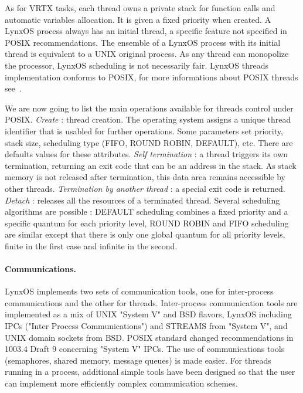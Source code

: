 \documentclass[10pt]{report}
\begin{document}
As for VRTX tasks, each thread owns a private stack for function calls and automatic variables allocation. It is given a fixed 
priority when created. A LynxOS process always has an initial thread, a specific feature not specified in POSIX recommendations.
The ensemble of a LynxOS process with its initial thread is equivalent to a UNIX original process. As any thread can
monopolize the processor, LynxOS scheduling is not necessarily fair. LynxOS threads implementation conforms to POSIX, for more 
informations about POSIX threads see~\cite{JMR:94}.

We are now going to list the main operations available for threads control under POSIX. {\em Create} : thread creation. 
The operating system assigns a unique thread identifier that is usabled for further operations. Some parameters set priority, stack size,
scheduling type (FIFO, ROUND ROBIN, DEFAULT), etc. There are defaults values for these attributes. {\em Self termination} :
a thread triggers its own termination, returning an exit code that can be an address in the stack. As stack memory is not released after 
termination, this data area remains accessible by other threads. {\em Termination by another thread} : a special exit code is returned.
{\em Detach } : releases all the resources of a terminated thread. Several scheduling algorithms are possible : DEFAULT scheduling 
combines a fixed priority and a specific quantum for each priority level, ROUND ROBIN and FIFO scheduling are similar except that there 
is only one global quantum for all priority levels, finite in the first case and infinite in the second.

\paragraph{Communications.} LynxOS implements two sets of communication tools, one for inter-process communications and the other for 
threads. Inter-process communication tools are implemented as a mix of UNIX "System V" and BSD flavors, LynxOS including IPCs ("Inter
Process Communications") and STREAMS from "System V", and UNIX domain sockets from BSD. POSIX standard changed recommendations
in 1003.4 Draft 9 concerning "System V" IPCs. The use of communications tools (semaphores, shared memory, message queues) is made
easier. For threads running in a process, additional simple tools have been designed so that the user can implement more efficiently 
complex communication schemes.
\end{document}
